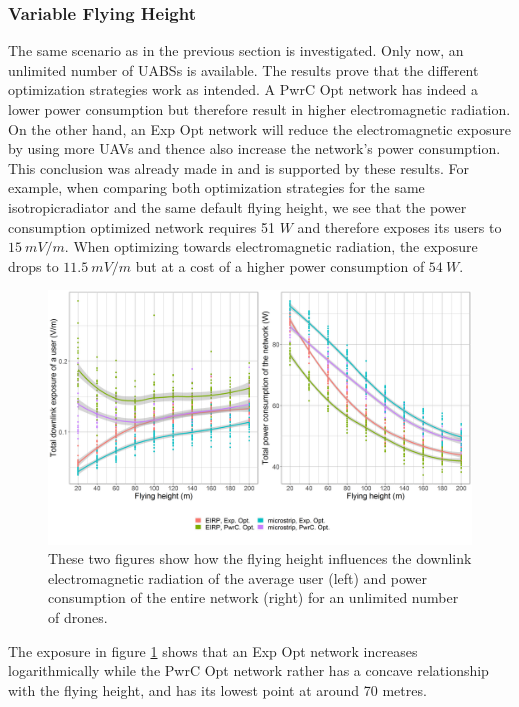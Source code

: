 \documentclass[twocolumn]{phdsymp} %
\begin{document}
\subsubsection{Variable Flying Height}
The same scenario as in the previous section is investigated. Only now, an unlimited number of \gls{UABS}s is available.
The results prove that the different optimization strategies work as intended.
A \gls{PwrC Opt} network has indeed a lower power consumption but therefore result in higher electromagnetic radiation.
On the other hand, an \gls{Exp Opt} network will reduce the electromagnetic exposure by using more \gls{UAV}s and thence also increase the network's
power consumption. This conclusion was already made in \cite{J1} and is supported by these results.
For example, when comparing both optimization strategies for the same \gls{isotropicradiator} and the same default flying height, we see that
the power consumption optimized network requires 51 $W$ and therefore exposes its users
to $15\ mV/m$. When optimizing towards electromagnetic radiation, the exposure drops to $11.5\ mV/m$ but at a cost of a higher power consumption
of $54\ W$.
\begin{figure}[h!]
  \includegraphics[width=\linewidth]{../results/s3/fhvsdlAndPc.png}
  \caption{These two figures show how the flying height influences the downlink electromagnetic radiation of the average user (left) and 
  power consumption of the entire network (right) for an unlimited number of drones.}
  \label{fig:s3a_dlAndPc}
\end{figure}

The exposure in figure \ref{fig:s3a_dlAndPc} shows that an \gls{Exp Opt} network increases logarithmically while the \gls{PwrC Opt} network rather 
has a concave relationship with the flying height, and has its lowest point at around 70 metres.
\end{document}
